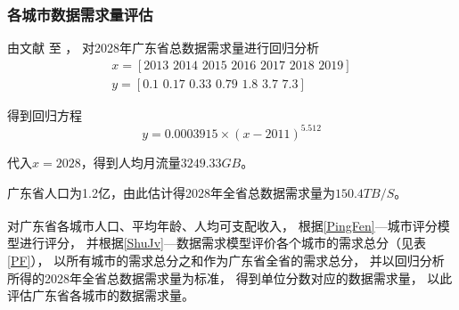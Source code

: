 \documentclass[UTF8,12pt]{ctexart}
\newcommand{\upcite}[1]{\textsuperscript{\cite{#1}}}
\begin{document}
        \subsubsection[网络需求评估]{各城市数据需求量评估}\label{WLXQPG}
            由文献\cite{yjJJ} 至 \cite{ysJJ}，
            对2028年广东省总数据需求量进行回归分析
            \begin{gather*}
                x=[2013\,\, 2014\,\, 2015\,\, 2016\,\, 2017\,\, 2018\,\, 2019]\\
                y=[0.1\,\, 0.17\,\, 0.33\,\, 0.79\,\, 1.8\,\, 3.7\,\, 7.3]
            \end{gather*}\par
            得到回归方程$$y=0.0003915×(x-2011)^{5.512}$$\par
            代入$x=2028$，得到人均月流量$3249.33GB$。\par
            广东省人口为1.2亿，由此估计得2028年全省总数据需求量为$150.4TB/S$。\par
            对广东省各城市人口、平均年龄、人均可支配收入\upcite{CSSJ}，
            根据\ref{PingFen}—城市评分模型进行评分，
            并根据\ref{ShuJv}—数据需求模型评价各个城市的需求总分（见表\ref{PF}），
            以所有城市的需求总分之和作为广东省全省的需求总分，
            并以回归分析所得的2028年全省总数据需求量为标准，
            得到单位分数对应的数据需求量，
            以此评估广东省各城市的数据需求量。
\end{document}
